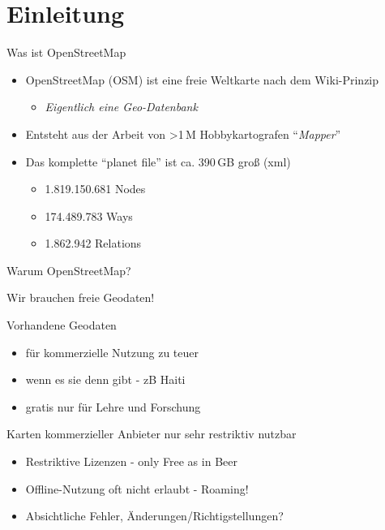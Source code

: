 \documentclass{beamer}
\begin{document}
\section{Einleitung}

\begin{frame}{Was ist OpenStreetMap}

\begin{itemize}
  \item OpenStreetMap (OSM) ist eine freie Weltkarte nach dem Wiki-Prinzip
  \begin{itemize}
    \item \emph{Eigentlich eine Geo-Datenbank}
  \end{itemize}
  \item Entsteht aus der Arbeit von \textgreater 1\,M Hobbykartografen ``\emph{Mapper}''
  \item Das komplette ``planet file'' ist ca. 390\,GB groß (xml)
  \begin{itemize}
    \item 1.819.150.681 Nodes
    \item 174.489.783 Ways
    \item 1.862.942 Relations
  \end{itemize}

\end{itemize}

\end{frame}


\begin{frame}{Warum OpenStreetMap?}

Wir brauchen freie Geodaten!

\pause
\vspace{2mm}
Vorhandene Geodaten 
\begin{itemize}
  \item	für kommerzielle Nutzung zu teuer
  \item	wenn es sie denn gibt - zB Haiti
  \item	gratis nur für Lehre und Forschung
\end{itemize}

\pause
\vspace{2mm}
Karten kommerzieller Anbieter nur sehr restriktiv nutzbar
\begin{itemize}
  \item Restriktive Lizenzen - only Free as in Beer
  \item Offline-Nutzung oft nicht erlaubt - Roaming!
  \item Absichtliche Fehler, Änderungen/Richtigstellungen?
\end{itemize}

\end{frame}
\end{document}
